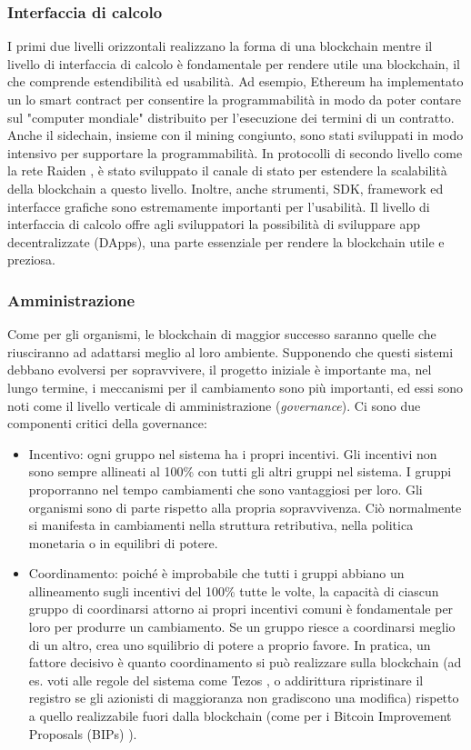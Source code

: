\documentclass[a4paper,12pt]{article}
\begin{document}
\subsubsection{Interfaccia di calcolo}
I primi due livelli orizzontali realizzano la forma di una blockchain mentre il livello di interfaccia di calcolo è fondamentale per rendere utile una blockchain, il che comprende estendibilità ed usabilità. Ad esempio, Ethereum ha implementato un lo smart contract per
consentire la programmabilità in modo da poter contare sul "computer mondiale" distribuito per l'esecuzione dei termini di un contratto. Anche il sidechain, insieme con il mining congiunto, sono stati sviluppati in modo intensivo per supportare la programmabilità. In protocolli di secondo livello come la rete Raiden \cite{c25}, è stato sviluppato il canale di stato per estendere la scalabilità della blockchain a questo livello. Inoltre, anche strumenti, SDK, framework ed interfacce grafiche sono
estremamente importanti per l'usabilità. Il livello di interfaccia di calcolo offre agli sviluppatori la possibilità di sviluppare app decentralizzate (DApps), una parte essenziale per rendere la blockchain utile e preziosa.

\subsubsection{Amministrazione}
Come per gli organismi, le blockchain di maggior successo saranno quelle che riusciranno ad adattarsi meglio al loro ambiente. Supponendo che questi sistemi debbano evolversi per sopravvivere, il progetto iniziale è importante ma, nel lungo termine, i meccanismi per il cambiamento
sono più importanti, ed essi sono noti come il livello verticale di amministrazione (\emph{governance}). Ci sono due componenti critici della governance:
\begin{itemize}
	\item
	      Incentivo: ogni gruppo nel sistema ha i propri incentivi. Gli incentivi non sono sempre allineati al 100\% con tutti gli altri gruppi nel sistema. I gruppi proporranno nel tempo cambiamenti che sono vantaggiosi per loro. Gli organismi sono di parte rispetto alla propria sopravvivenza. Ciò normalmente si manifesta in cambiamenti nella struttura retributiva, nella politica monetaria o in equilibri di potere.

	\item
	      Coordinamento: poiché è improbabile che tutti i gruppi abbiano un allineamento sugli incentivi del 100\% tutte le volte, la capacità di ciascun gruppo di coordinarsi attorno ai propri incentivi comuni è fondamentale per loro per produrre un cambiamento. Se un gruppo riesce a  coordinarsi meglio di un altro, crea uno squilibrio di potere a proprio favore. In pratica, un fattore decisivo è quanto coordinamento si può realizzare sulla blockchain (ad es. voti alle regole del sistema come Tezos \cite{c34}, o addirittura ripristinare il registro se gli azionisti di maggioranza non gradiscono una modifica) rispetto a quello realizzabile fuori dalla blockchain (come per i Bitcoin Improvement Proposals (BIPs)
	      \cite{c3}).

\end{itemize}
\end{document}
